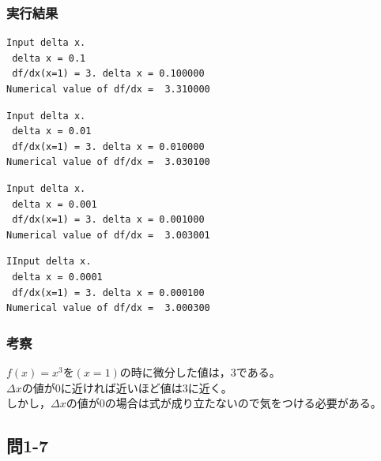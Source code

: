 \documentclass{jarticle}
\begin{document}
\subsubsection{実行結果\\}
\begin{breakbox}
\begin{verbatim}
Input delta x. 
 delta x = 0.1 
 df/dx(x=1) = 3. delta x = 0.100000 
Numerical value of df/dx =  3.310000 
\end{verbatim}
\end{breakbox}

\begin{breakbox}
\begin{verbatim}
Input delta x. 
 delta x = 0.01
 df/dx(x=1) = 3. delta x = 0.010000 
Numerical value of df/dx =  3.030100 
\end{verbatim}
\end{breakbox}

\begin{breakbox}
\begin{verbatim}
Input delta x. 
 delta x = 0.001
 df/dx(x=1) = 3. delta x = 0.001000 
Numerical value of df/dx =  3.003001 
\end{verbatim}
\end{breakbox}

\begin{breakbox}
\begin{verbatim}
IInput delta x. 
 delta x = 0.0001
 df/dx(x=1) = 3. delta x = 0.000100 
Numerical value of df/dx =  3.000300 
\end{verbatim}
\end{breakbox}
\subsubsection{考察\\}
$f(x) = x^3を(x=1)の時に微分した値は，3である。$\\
$\Delta {x}の値が0に近ければ近いほど値は3に近く。$\\
$しかし，\Delta {x}の値が0の場合は式が成り立たないので気をつける必要がある。$\\

\subsection{問1-7\\}
\end{document}
